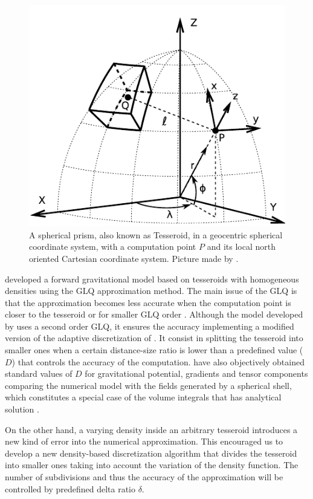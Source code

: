 \documentclass[extra]{gji}
\begin{document}
\begin{figure}
\centering
\includegraphics[width=0.9\linewidth]{figures/tesseroid-uieda.pdf}
\caption{
    A spherical prism, also known as  Tesseroid, in a geocentric spherical 
    coordinate system, with a computation point $P$ and its local north 
    oriented Cartesian coordinate system. Picture made by \citet{Uieda2015}.
}
\label{fig:tesseroid-uieda}
\end{figure}

\citet{Uieda2016} developed a forward gravitational model based on 
tesseroids with homogeneous densities using the GLQ approximation 
method.
The main issue of the GLQ is that the approximation becomes less 
accurate when the computation point is closer to the tesseroid or for 
smaller GLQ order \citep{Ku1977}.
Although the model developed by \citet{Uieda2016} uses a second order GLQ, it 
ensures the accuracy implementing a modified version of the adaptive 
discretization of \citet{Li2011}.
It consist in splitting the tesseroid into smaller ones when a certain 
distance-size ratio is lower than a predefined value ($D$) that controls the 
accuracy of the computation.
\citet{Uieda2016} have also objectively obtained standard values of $D$ 
for gravitational potential, gradients and tensor components comparing 
the numerical model with the fields generated by a spherical shell, 
which constitutes a special case of the volume integrals that has 
analytical solution \citep{LaFehr1991, Mikuska2006, Grombein2013} 
.

On the other hand, a varying density inside an arbitrary tesseroid 
introduces a new kind of error into the numerical approximation.
This encouraged us to develop a new density-based discretization 
algorithm that divides the tesseroid into smaller ones taking into 
account the variation of the density function.
The number of subdivisions and thus the accuracy of the approximation 
will be controlled by predefined delta ratio $\delta$.
\end{document}
